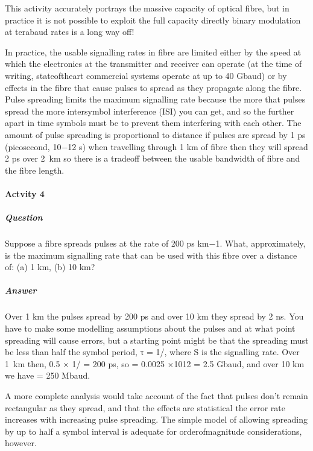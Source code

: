\documentclass[letterpaper,10pt,english]{sphinxmanual}
\begin{document}
This activity accurately portrays the massive  capacity of optical fibre, but in practice it is not possible to exploit the full capacity directly \textendash{} binary modulation at terabaud rates is a long way off!

In practice, the usable signalling rates in fibre are limited either by the speed at which the electronics at the transmitter and receiver can operate (at the time of writing, state\sphinxhyphen{}of\sphinxhyphen{}the\sphinxhyphen{}art commercial systems operate at up to 40 Gbaud) or by effects in the fibre that cause pulses to spread as they propagate along the fibre. Pulse spreading limits the maximum signalling rate because the more that pulses spread the more inter\sphinxhyphen{}symbol interference (ISI) you can get, and so the further apart in
time symbols must be to prevent them interfering with each other. The amount of pulse spreading is proportional to distance \textendash{} if pulses are spread by 1 ps (picosecond, 10−12 s) when travelling through 1 km of fibre then they will spread 2 ps over 2 km \textendash{} so there is a trade\sphinxhyphen{}off between the usable bandwidth of fibre and the fibre length.


\paragraph{Actvity 4}
\label{\detokenize{content/session_00/Part_00_02:Actvity-4}}

\subparagraph{Question}
\label{\detokenize{content/session_00/Part_00_02:id11}}
Suppose a fibre spreads pulses at the rate of 200 ps km−1. What, approximately, is the maximum signalling rate that can be used with this fibre over a distance of: (a) 1 km, (b) 10 km?


\subparagraph{Answer}
\label{\detokenize{content/session_00/Part_00_02:id12}}
Over 1 km the pulses spread by 200 ps and over 10 km they spread by 2 ns. You have to make some modelling assumptions about the pulses and at what point spreading will cause errors, but a starting point might be that the spreading must be less than half the symbol period, τ = 1/, where S is the signalling rate. Over 1 km then, 0.5 × 1/ = 200 ps, so  = 0.0025 ×1012 = 2.5 Gbaud, and over 10 km we have  = 250 Mbaud.

A more complete analysis would take account of the fact that pulses don’t remain rectangular as they spread, and that the effects are statistical \textendash{} the error rate increases with increasing pulse spreading. The simple model of allowing spreading by up to half a symbol interval is adequate for order\sphinxhyphen{}of\sphinxhyphen{}magnitude considerations, however.
\end{document}
